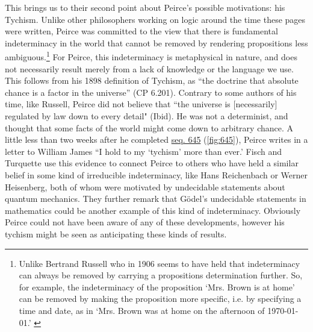 This brings us to their second point about Peirce's possible motivations: his Tychism. Unlike other philosophers working on logic around the time these pages were written, Peirce was committed to the view that there is fundamental indeterminacy in the world that cannot be removed by rendering propositions less ambiguous.\footnote{Unlike Bertrand Russell who in 1906 seems to have held that indeterminacy can always be removed by carrying a propositions determination further. So, for example, the indeterminacy of the proposition `Mrs. Brown is at home' can be removed by making the proposition more specific, i.e. by specifying a time and date, as in `Mrs. Brown was at home on the afternoon of \today.' \citep{russell_review_1906}} For Peirce, this indeterminacy is metaphysical in nature, and does not necessarily result merely from a lack of knowledge or the language we use. This follows from his 1898 definition of Tychism, as ``the doctrine that absolute chance is a factor in the universe'' (CP 6.201). Contrary to some authors of his time, like Russell, Peirce did not believe that ``the universe is [necessarily] regulated by law down to every detail" (Ibid). He was not a determinist, and thought that some facts of the world might come down to arbitrary chance. A little less than two weeks after he completed \href{https://iiif.lib.harvard.edu/manifests/view/drs:15255301$645i}{seq. 645} (\ref{fig:645}), Peirce writes in a letter to William James ``I hold to my `tychism' more than ever.' Fisch and Turquette use this evidence to connect Peirce to others who have held a similar belief in some kind of irreducible indeterminacy, like Hans Reichenbach or Werner Heisenberg, both of whom were motivated by undecidable statements about quantum mechanics. They further remark that Gödel's undecidable statements in mathematics could be another example of this kind of indeterminacy. Obviously Peirce could not have been aware of any of these developments, however his tychism might be seen as anticipating these kinds of results.

